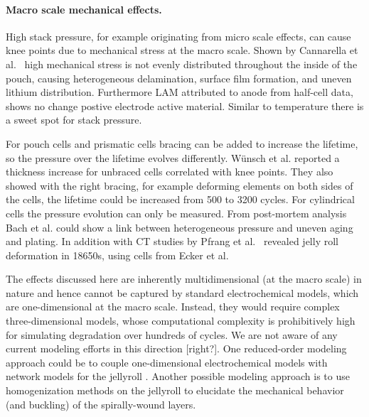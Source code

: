 \documentclass{article}
\begin{document}
\paragraph{Macro scale mechanical effects.}

High stack pressure, for example originating from micro scale effects, can cause knee points due to mechanical stress at the macro scale. Shown by Cannarella et al.~\cite{cannarella_stress_2014} high mechanical stress is not evenly distributed throughout the inside of the pouch, causing heterogeneous delamination, surface film formation, and uneven lithium distribution. Furthermore LAM attributed to anode from half-cell data, shows no change postive electrode active material. Similar to temperature there is a sweet spot for stack pressure\cite{cannarella_stress_2014}. 

For pouch cells \cite{wunsch_investigation_2019} and prismatic cells\cite{cannarella_stress_2014} bracing can be added to increase the lifetime, so the pressure over the lifetime evolves differently. Wünsch et al. \cite{wunsch_investigation_2019} reported a thickness increase for unbraced cells correlated with knee points. They also showed with the right bracing, for example deforming elements on both sides of the cells, the lifetime could be increased from 500 to 3200 cycles. For cylindrical cells\cite{willenberg_high-precision_2020} the pressure evolution can only be measured. From post-mortem analysis Bach et al. could show a link between heterogeneous pressure and uneven aging and plating\cite{bach_nonlinear_2016}.
In addition with CT studies by  Pfrang et al.~\cite{pfrang_long-term_2018} revealed jelly roll deformation in 18650s, using cells from Ecker et al. \cite{ecker_calendar_2014}

The effects discussed here are inherently multidimensional (at the macro scale) in nature and hence cannot be captured by standard electrochemical models, which are one-dimensional at the macro scale. Instead, they would require complex three-dimensional models, whose computational complexity is prohibitively high for simulating degradation over hundreds of cycles. We are not aware of any current modeling efforts in this direction [right?]. One reduced-order modeling approach could be to couple one-dimensional electrochemical models with network models for the jellyroll \cite{tranter_probing_2020}. Another possible modeling approach is to use homogenization methods on the jellyroll \cite{psaltis_homogenisation_2020} to elucidate the mechanical behavior (and buckling) of the spirally-wound layers.
\end{document}
